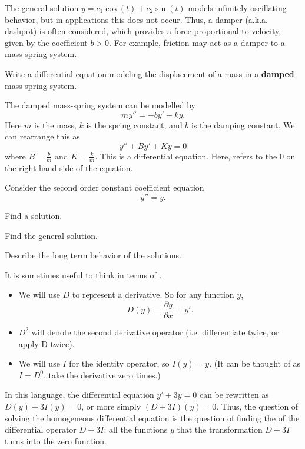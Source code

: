 \begin{applicationActivities}
\begin{activity}{5}
The general solution \(y=c_1\cos(t)+c_2\sin(t)\) models infinitely oscillating behavior,
but in applications this does not occur.
\vfill
Thus, a damper (a.k.a. dashpot) is often considered, which provides a force proportional to
velocity, given by the coefficient \(b>0\). For example, friction may act as a damper to a mass-spring system. 
\begin{center}
\springmassdamper
\end{center}
\vfill
Write a differential equation modeling the displacement of a mass in a \textbf{damped} mass-spring system.
\vfill
\end{activity}

\begin{observation}
The damped mass-spring system can be modelled by
\[my''=-by'-ky.\]
Here \(m\) is the mass, \(k\) is the spring constant, and \(b\) is the damping constant.  We can rearrange this as
\[y''+By'+Ky=0\]
where \(B=\frac{b}{m}\) and \(K=\frac{k}{m}\).
\vfill
This is a   differential equation.
Here,  refers to the \(0\) on the right hand side of the equation.
\end{observation}

\begin{activity}{15}
Consider the second order constant coefficient equation \[y''=y.\]
\begin{subactivity}
Find a solution.
\end{subactivity}
\begin{subactivity}
Find the general solution.
\end{subactivity}
\begin{subactivity}
Describe the long term behavior of the solutions.
\end{subactivity}
\end{activity}

\begin{observation}
It is sometimes useful to think in terms of .
\begin{itemize}
\item We will use \(D\) to represent a derivative.%
  So for any function \(y\),  \[D(y)=\frac{\partial y}{\partial x}=y'.\]
\item \(D^2\) will denote the second derivative operator (i.e. differentiate twice, or apply D twice).
\item We will use \(I\) for the identity operator, so \(I(y)=y\).  
  (It can be thought of as \(I=D^0\), take the derivative zero times.)
\end{itemize}
\vfill
In this language, the differential equation \(y'+3y=0\) can be rewritten as \(D(y)+3I(y)=0\), 
or more simply \( (D+3I)(y)=0\).
\vfill
Thus, the question of solving the homogeneous differential equation is the question of finding the 
 of the differential operator \(D+3I\): all the functions \(y\) that the transformation
\(D+3I\) turns into the zero function.
\end{observation}


\end{applicationActivities}
